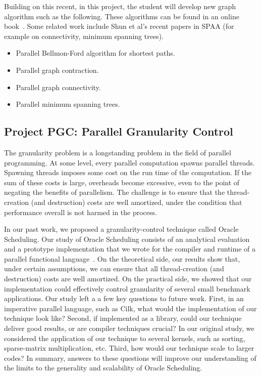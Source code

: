 \documentclass[11pt]{article}
\begin{document}
Building on this recent, in this project, the student will develop new
graph algorithm such as the following.  These algorithms can be found
in an online book~\cite{AB-book}.  Some related work include Shun et
al's recent papers in SPAA (for example on connectivity, minimum
spanning trees).

\begin{itemize}
\item
Parallel Bellmon-Ford algorithm for shortest paths.

\item
Parallel graph contraction.

\item
Parallel graph connectivity.

\item
Parallel minimum spanning trees.
\end{itemize}


\subsection{Project PGC: Parallel Granularity Control}

The granularity problem is a longstanding problem in the field of
parallel programming.  At some level, every parallel computation
spawns parallel threads.  Spawning threads imposes some cost on the
run time of the computation.  If the sum of these costs is large,
overheads become excessive, even to the point of negating the benefits
of parallelism.  The challenge is to ensure that the thread-creation
(and destruction) costs are well amortized, under the condition that
performance overall is not harmed in the process.

In our past work, we proposed a granularity-control technique called
Oracle Scheduling.  Our study of Oracle Scheduling consists of an
analytical evaluation and a prototype implementation that we wrote for
the compiler and runtime of a parallel functional
language~\cite{AcarChRa11}.  On the theoretical side, our results show
that, under certain assumptions, we can ensure that all
thread-creation (and destruction) costs are well amortized.  On the
practical side, we showed that our implementation could effectively
control granularity of several small benchmark applications.  Our
study left a a few key questions to future work.  First, in an
imperative parallel language, such as Cilk, what would the
implementation of our technique look like?  Second, if implemented as
a library, could our technique deliver good results, or are compiler
techniques crucial?  In our original study, we considered the
application of our technique to several kernels, such as sorting,
sparse-matrix multiplication, etc.  Third, how would our technique
scale to larger codes?  In summary, answers to these questions will
improve our understanding of the limits to the generality and
scalability of Oracle Scheduling.
\end{document}
